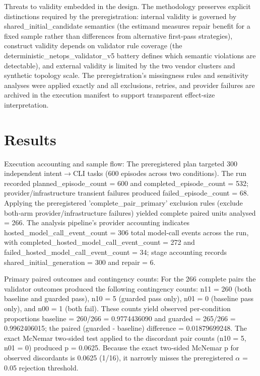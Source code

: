 \documentclass[conference]{IEEEtran}
\begin{document}
Threats to validity embedded in the design.  The methodology preserves explicit distinctions required by the preregistration: internal validity is governed by shared\_initial\_candidate semantics (the estimand measures repair benefit for a fixed sample rather than differences from alternative first‑pass strategies), construct validity depends on validator rule coverage (the deterministic\_netops\_validator\_v5 battery defines which semantic violations are detectable), and external validity is limited by the two vendor clusters and synthetic topology scale. The preregistration's missingness rules and sensitivity analyses were applied exactly and all exclusions, retries, and provider failures are archived in the execution manifest to support transparent effect‑size interpretation.

\section{Results}
Execution accounting and sample flow: The preregistered plan targeted 300 independent intent\ensuremath{\rightarrow}CLI tasks (600 episodes across two conditions). The run recorded planned\_episode\_count = 600 and completed\_episode\_count = 532; provider/infrastructure transient failures produced failed\_episode\_count = 68. Applying the preregistered 'complete\_pair\_primary' exclusion rules (exclude both‑arm provider/infrastructure failures) yielded complete paired units analysed = 266. The analysis pipeline's provider accounting indicates hosted\_model\_call\_event\_count = 306 total model‑call events across the run, with completed\_hosted\_model\_call\_event\_count = 272 and failed\_hosted\_model\_call\_event\_count = 34; stage accounting records shared\_initial\_generation = 300 and repair = 6.

Primary paired outcomes and contingency counts: For the 266 complete pairs the validator outcomes produced the following contingency counts: n11 = 260 (both baseline and guarded pass), n10 = 5 (guarded pass only), n01 = 0 (baseline pass only), and n00 = 1 (both fail). These counts yield observed per‑condition proportions baseline = 260/266 = 0.9774436090 and guarded = 265/266 = 0.9962406015; the paired (guarded - baseline) difference = 0.01879699248. The exact McNemar two‑sided test applied to the discordant pair counts (n10 = 5, n01 = 0) produced p = 0.0625. Because the exact two‑sided McNemar p for observed discordants is 0.0625 (1/16), it narrowly misses the preregistered \ensuremath{\alpha} = 0.05 rejection threshold.
\end{document}
